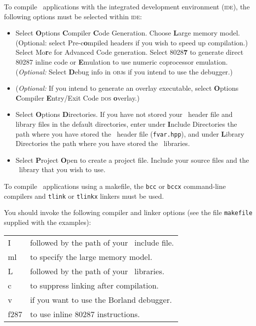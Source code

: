 \documentclass{admbmanual}
\makeatletter
\newenvironment{commandtable}
  { 
    \par
    \begin{tabular}{@{\vrule height 12pt depth7pt width0pt}@{\tt-}l @{\rm\quad} l}
  }
  {
    \end{tabular}
    \medskip
   }
\makeatother
\begin{document}
To compile \scAD\ applications with the integrated development environment
(\textsc{ide}), the following options must be selected within \textsc{ide}:
\begin{itemize} 
\item Select {\bf O}ptions {\bf C}ompiler {\bf C}ode Generation.
Choose {\bf L}arge memory model. 
(Optional: select Pre-c{\bf o}mpiled 
headers if you wish to speed up compilation.)
Select Mo{\bf r}e for Advanced Code generation. Select 8028{\bf 7} to
generate direct 80287 inline code or {\bf E}mulation to use numeric
coprocessor emulation. 
(\textit{Optional:} Select {\bf D}ebug info in \textsc{obj}s if you intend to use the
debugger.)
\item (\textit{Optional:} If you intend to generate an overlay executable,
select {\bf O}ptions {\bf C}ompiler {\bf E}ntry/Exit Code \textsc{dos} {\bf o}verlay.)
\item Select {\bf O}ptions {\bf D}irectories. If you have not stored
your \scAD\ header file and library files in the default directories,
enter under {\bf I}nclude Directories the path where you have stored the \scAD\ header file (\texttt{fvar.hpp}), 
 and under {\bf L}ibrary Directories the path where you have stored the
\scAD\ libraries.
\item Select {\bf P}roject {\bf O}pen to create a project file.
Include your source files and the \scAD\ library that you wish to use.
\end{itemize}


To compile \scAD\ applications using a makefile, the \texttt{bcc} or \texttt{bccx}
command-line compilers and \texttt{tlink} or \texttt{tlinkx} linkers must be used.

You should invoke the following
compiler and linker options (see the file \texttt{makefile} supplied with the examples):
\begin{commandtable}
     I  &  followed by the path of your \scAD\ include file.\\
     ml  &  to specify the large memory model. \\
     L  &  followed by the path of your \scAD\ libraries.\\
    c  &  to suppress linking after compilation.\\
    v  &  if you want to use the Borland debugger.\\
    f287  &   to use inline 80287 instructions.\\
\end{commandtable}
\end{document}
